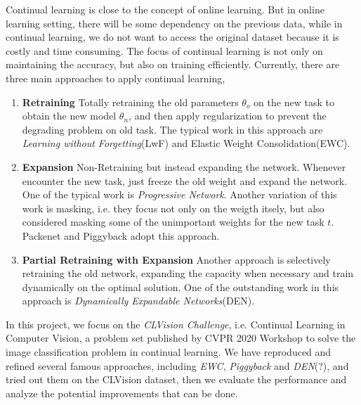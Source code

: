 Continual learning is close to the concept of online learning. But in online learning setting, there will be some dependency on the previous data, while in continual learning, we do not want to access the original dataset because it is costly and time consuming. The focus of continual learning is not only on maintaining the accuracy, but also on training efficiently. Currently, there are three main approaches to apply continual learning,
\begin{enumerate}
\item \textbf{Retraining}
Totally retraining the old parameters $\theta_o$ on the new task to obtain the new model $\theta_n$, and then apply regularization to prevent the degrading problem on old task. The typical work in this approach are \textit{Learning without Forgetting}(LwF)\cite{li2017learning} and  Elastic Weight Consolidation(EWC)\cite{kirkpatrick2017overcoming}. 
\item \textbf{Expansion}
Non-Retraining but instead expanding the network. Whenever encounter the new task, just freeze the old weight and expand the network. One of the typical work is \textit{Progressive Network}\cite{rusu2016progressive}. Another variation of this work is masking, i.e. they focus not only on the weigth itsely, but also considered masking some of the unimportant weights for the new task $t$. Packenet\cite{mallya2018packnet} and Piggyback\cite{mallya2018piggyback} adopt this approach.
\item \textbf{Partial Retraining with Expansion}
Another approach is selectively retraining the old network, expanding the capacity when necessary and train dynamically on the optimal solution. One of the outstanding work in this approach is \textit{Dynamically Expandable Networks}(DEN)\cite{yoon2017lifelong}.
\end{enumerate}

In this project, we focus on the \textit{CLVision Challenge}, i.e. Continual Learning in Computer Vision, a problem set published by CVPR 2020 Workshop to solve the image classification problem in continual learning. We have reproduced and refined several famous approaches, including \textit{EWC}, \textit{Piggyback} and \textit{DEN}(?), and tried out them on the CLVision dataset, then we evaluate the performance and analyze the potential improvements that can be done. 